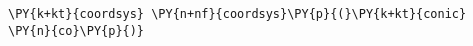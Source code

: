 \begin{Verbatim}[commandchars=\\\{\}]
    \PY{k+kt}{coordsys} \PY{n+nf}{coordsys}\PY{p}{(}\PY{k+kt}{conic} \PY{n}{co}\PY{p}{)}
\end{Verbatim}

